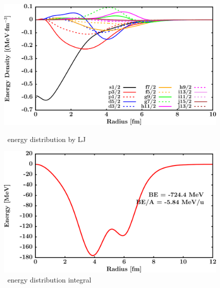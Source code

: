 \begin{figure}[hbtp]
    \centering
    \begin{minipage}{0.45\textwidth}
        \centering
        \includegraphics[width=\textwidth]{figures/sn124_EnergyDist.png}
        \caption*{\snFour\ energy distribution by LJ}
        \label{DOMFitData_sn124_proton_energyDistInt}
    \end{minipage}\hspace{6pt}
    \begin{minipage}{0.45\textwidth}
        \centering
        \includegraphics[width=\textwidth]{figures/sn124_EnergyDistIntegral.png}
        \caption*{\snFour\ energy distribution integral}
        \label{DOMFitData_sn124_neutron_energyDistInt}
    \end{minipage}
\end{figure}
\vspace{0.4in}
